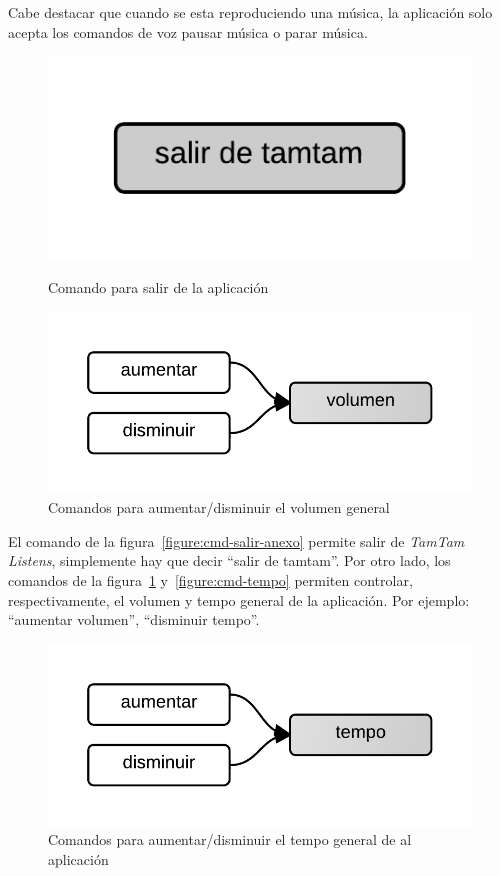 Cabe destacar que cuando se esta reproduciendo una m\'usica, la aplicaci\'on solo acepta los comandos de
voz pausar m\'usica o parar m\'usica.


\begin{figure}[H]
\begin{minipage}[b]{0.5\linewidth}
\centering
\includegraphics[width=0.6\linewidth]{./graphics/salir.png}
\caption{Comando para salir de la aplicaci\'on}
\label{figure:cmd-salir-anexo}
\end{minipage}
\quad
\begin{minipage}[b]{0.5\linewidth}
\centering
\includegraphics[width=0.6\linewidth]{./graphics/cmd-vol.png}
\caption{Comandos para aumentar/disminuir el volumen general}
\label{figure:cmd-vol-anexo}
\end{minipage}
\end{figure}

El comando de la figura~\ref{figure:cmd-salir-anexo} permite salir de \emph{TamTam Listens}, simplemente hay que decir ``salir de tamtam''. Por otro lado, los comandos de la figura~\ref{figure:cmd-vol-anexo}
y~\ref{figure:cmd-tempo} permiten controlar, respectivamente, el volumen y tempo general de la aplicaci\'on. Por ejemplo: ``aumentar volumen'', ``disminuir tempo''.

 \begin{figure}[H]
\begin{minipage}[b]{0.5\linewidth}
\centering
\includegraphics[width=0.6\linewidth]{./graphics/cmd-tempo.png}
\caption{Comandos para aumentar/disminuir el tempo general de al aplicaci\'on}
\label{figure:cmd-tempo-anexo}
\end{minipage}
\end{figure}
 
